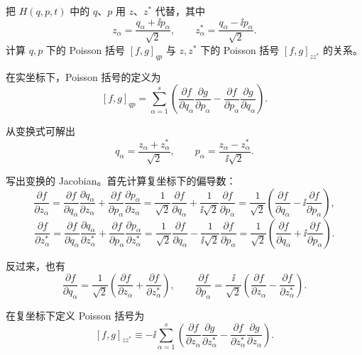 


\begin{question}
把 \(H(q,p,t)\) 中的 \(q\)、\(p\) 用 \(z\)、\(z^*\) 代替，其中
\[
z_\alpha = \frac{q_\alpha+\ii p_\alpha}{\sqrt2},\qquad
z_\alpha^* = \frac{q_\alpha-\ii p_\alpha}{\sqrt2}.
\]
计算 \(q,p\) 下的 Poisson 括号 \([f,g]_{qp}\) 与 \(z,z^*\) 下的 Poisson 括号 \([f,g]_{zz^*}\) 的关系。
\begin{solution}
在实坐标下，Poisson 括号的定义为
\[
[f,g]_{qp}=\sum_{\alpha=1}^s\left(
\frac{\partial f}{\partial q_\alpha}\frac{\partial g}{\partial p_\alpha}
-\frac{\partial f}{\partial p_\alpha}\frac{\partial g}{\partial q_\alpha}
\right).
\]

从变换式可解出
\[
q_\alpha = \frac{z_\alpha+z_\alpha^*}{\sqrt2},\qquad
p_\alpha = \frac{z_\alpha-z_\alpha^*}{\ii\sqrt2}.
\]

写出变换的 Jacobian。首先计算复坐标下的偏导数：
\[
\frac{\partial f}{\partial z_\alpha}
= \frac{\partial f}{\partial q_\alpha}\frac{\partial q_\alpha}{\partial z_\alpha}
+\frac{\partial f}{\partial p_\alpha}\frac{\partial p_\alpha}{\partial z_\alpha}
= \frac{1}{\sqrt2}\frac{\partial f}{\partial q_\alpha}
+\frac{1}{\ii\sqrt2}\frac{\partial f}{\partial p_\alpha}
= \frac{1}{\sqrt2}\left(\frac{\partial f}{\partial q_\alpha}
-\ii\frac{\partial f}{\partial p_\alpha}\right),
\]
\[
\frac{\partial f}{\partial z_\alpha^*}
= \frac{\partial f}{\partial q_\alpha}\frac{\partial q_\alpha}{\partial z_\alpha^*}
+\frac{\partial f}{\partial p_\alpha}\frac{\partial p_\alpha}{\partial z_\alpha^*}
= \frac{1}{\sqrt2}\frac{\partial f}{\partial q_\alpha}
-\frac{1}{\ii\sqrt2}\frac{\partial f}{\partial p_\alpha}
= \frac{1}{\sqrt2}\left(\frac{\partial f}{\partial q_\alpha}
+\ii\frac{\partial f}{\partial p_\alpha}\right).
\]

反过来，也有
\[
\frac{\partial f}{\partial q_\alpha}
= \frac{1}{\sqrt2}\left(
\frac{\partial f}{\partial z_\alpha}+\frac{\partial f}{\partial z_\alpha^*}
\right),\qquad
\frac{\partial f}{\partial p_\alpha}
= \frac{\ii}{\sqrt2}\left(
\frac{\partial f}{\partial z_\alpha}-\frac{\partial f}{\partial z_\alpha^*}
\right).
\]

在复坐标下定义 Poisson 括号为
\[
[f,g]_{zz^*}
\equiv -\ii\sum_{\alpha=1}^s\left(
\frac{\partial f}{\partial z_\alpha}\frac{\partial g}{\partial z_\alpha^*}
-\frac{\partial f}{\partial z_\alpha^*}\frac{\partial g}{\partial z_\alpha}
\right).
\]


\end{solution}
\end{question}
